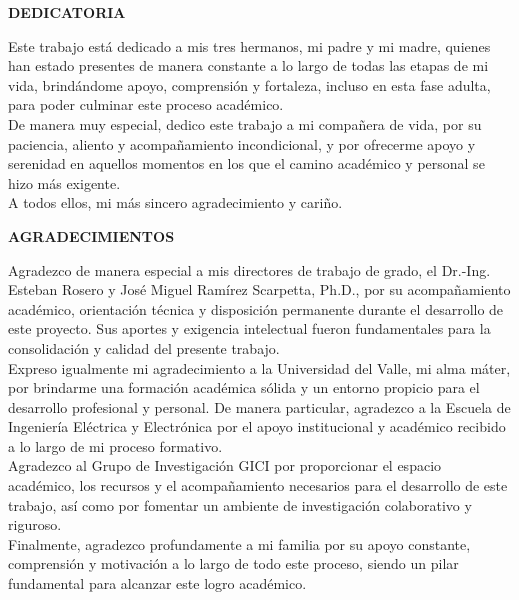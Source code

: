 \documentclass[12pt]{report}
\begin{document}
\begin{justify}
    \newpage
    \thispagestyle{empty}
    \begin{center}
        \textbf{DEDICATORIA}
    \end{center}

    \vspace{1cm}

    Este trabajo está dedicado a mis tres hermanos, mi padre y mi madre, quienes han estado presentes de manera constante a lo largo de todas las etapas de mi vida, brindándome apoyo, comprensión y fortaleza, incluso en esta fase adulta, para poder culminar este proceso académico.\\

    De manera muy especial, dedico este trabajo a mi compañera de vida, por su paciencia, aliento y acompañamiento incondicional, y por ofrecerme apoyo y serenidad en aquellos momentos en los que el camino académico y personal se hizo más exigente.\\

    A todos ellos, mi más sincero agradecimiento y cariño.


    \newpage
    \thispagestyle{empty}
    \begin{center}
        \textbf{AGRADECIMIENTOS}
    \end{center}

    \vspace{1cm}

    Agradezco de manera especial a mis directores de trabajo de grado, el Dr.-Ing. Esteban Rosero y José Miguel Ramírez Scarpetta, Ph.D., por su acompañamiento académico, orientación técnica y disposición permanente durante el desarrollo de este proyecto. Sus aportes y exigencia intelectual fueron fundamentales para la consolidación y calidad del presente trabajo.\\

    Expreso igualmente mi agradecimiento a la Universidad del Valle, mi alma máter, por brindarme una formación académica sólida y un entorno propicio para el desarrollo profesional y personal. De manera particular, agradezco a la Escuela de Ingeniería Eléctrica y Electrónica por el apoyo institucional y académico recibido a lo largo de mi proceso formativo.\\

    Agradezco al Grupo de Investigación GICI por proporcionar el espacio académico, los recursos y el acompañamiento necesarios para el desarrollo de este trabajo, así como por fomentar un ambiente de investigación colaborativo y riguroso.\\

    Finalmente, agradezco profundamente a mi familia por su apoyo constante, comprensión y motivación a lo largo de todo este proceso, siendo un pilar fundamental para alcanzar este logro académico.

\end{justify}
\end{document}

